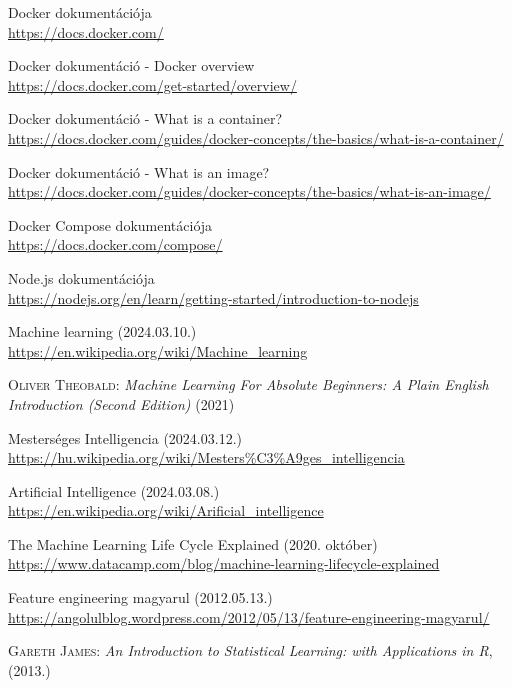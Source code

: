 \documentclass[
]{thesis-ekf}
\theoremstyle{definition}
\theoremstyle{remark}
\begin{document}
\begin{thebibliography}{2}
Docker dokumentációja
\\\url{https://docs.docker.com/}

Docker dokumentáció - Docker overview
\\\url{https://docs.docker.com/get-started/overview/}

Docker dokumentáció - What is a container?
\\\url{https://docs.docker.com/guides/docker-concepts/the-basics/what-is-a-container/}

Docker dokumentáció - What is an image?
\\\url{https://docs.docker.com/guides/docker-concepts/the-basics/what-is-an-image/}

Docker Compose dokumentációja
\\\url{https://docs.docker.com/compose/}

Node.js dokumentációja
\\\url{https://nodejs.org/en/learn/getting-started/introduction-to-nodejs}

Machine learning (2024.03.10.)
\\\url{https://en.wikipedia.org/wiki/Machine_learning}

\textsc{Oliver Theobald}: \emph{Machine Learning For Absolute Beginners: A Plain English Introduction (Second Edition)} (2021)

Mesterséges Intelligencia (2024.03.12.)
\\\url{https://hu.wikipedia.org/wiki/Mesters%C3%A9ges_intelligencia}

Artificial Intelligence (2024.03.08.)
\\\url{https://en.wikipedia.org/wiki/Arificial_intelligence}

The Machine Learning Life Cycle Explained (2020. október)
\\\url{https://www.datacamp.com/blog/machine-learning-lifecycle-explained}

Feature engineering magyarul (2012.05.13.)
\\\url{https://angolulblog.wordpress.com/2012/05/13/feature-engineering-magyarul/}

\textsc{Gareth James}: \emph{An Introduction to Statistical Learning: with Applications in R}, (2013.)


\end{thebibliography}
\end{document}
